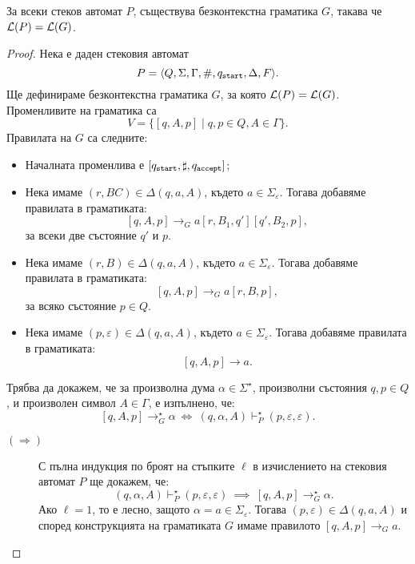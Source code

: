 \begin{framed}
  \begin{lemma}
    За всеки стеков автомат $P$, съществува безконтекстна граматика $G$, такава че $\mathcal{L}(P) = \mathcal{L}(G)$.
  \end{lemma}
\end{framed}
\begin{proof}
  Нека е даден стековия автомат
  \[P = \langle{Q,\Sigma,\Gamma,\#,q_{\texttt{start}},\Delta,F}\rangle.\]
  Ще дефинираме безконтекстна граматика $G$, за която $\mathcal{L}(P) = \mathcal{L}(G)$.
  Променливите на граматика са 
  \[V = \{[q,A,p] \mid q,p \in Q, A \in \Gamma\}.\]
  Правилата на $G$ са следните:
  \begin{itemize}
  \item
    Началната променлива е $[q_{\texttt{start}},\sharp,q_{\texttt{accept}}]$;
  \item
    Нека имаме $(r,BC) \in \Delta(q, a, A)$, където $a \in \Sigma_\varepsilon$.
    Тогава добавяме правилата в граматиката:
    \[[q,A,p] \to_G a[r,B_1,q'][q',B_2,p],\]
    за всеки две състояние $q'$ и $p$.
  \item
    Нека имаме $(r,B) \in \Delta(q, a, A)$, където $a \in \Sigma_\varepsilon$.
    Тогава добавяме правилата в граматиката:
    \[[q,A,p] \to_G a[r,B,p],\]
    за всяко състояние $p \in Q$.
  \item
    Нека имаме $(p,\varepsilon) \in \Delta(q,a,A)$, където $a \in \Sigma_\varepsilon$.
    Тогава добавяме правилата в граматиката:
    \[[q,A,p] \to a.\]
  \end{itemize}
  Трябва да докажем, че за произволна дума $\alpha \in \Sigma^\star$, произволни състояния $q,p \in Q$,
  и произволен символ $A \in \Gamma$, е изпълнено, че:
  \[[q,A,p] \rightarrow^\star_G \alpha\ \Leftrightarrow\ (q,\alpha,A) \vdash^\star_{P} (p,\varepsilon,\varepsilon).\]
  \begin{description}
  \item[$(\Rightarrow)$]
    С пълна индукция по броят на стъпките $\ell$ в изчислението на стековия автомат $P$ ще докажем, че:
    \[(q,\alpha,A) \vdash^\star_P (p,\varepsilon,\varepsilon)\ \implies\ [q,A,p] \to^\star_G \alpha.\]
    Ако $\ell = 1$, то е лесно, защото $\alpha = a \in \Sigma_\varepsilon$.
    Тогава $(p,\varepsilon) \in \Delta(q,a,A)$ и според конструкцията на граматиката $G$ имаме правилото $[q,A,p] \to_G a$.
    

\end{description}
\end{proof}

